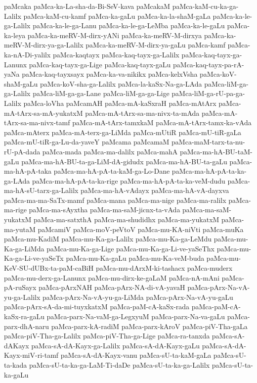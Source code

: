 {paMcaka
paMca-ka-La-sha-da-Bi-SeV-kava
paMcakaM
paMca-kaM-cu-ka-ga-Lalilx
paMca-kaM-cu-kamf
paMca-ka-gaLu
paMca-ka-la-shaM-gaLa
paMca-ka-le-ga-Lalilx
paMca-ka-le-ga-Lanu
paMca-ka-le-ga-LeMba
paMca-ka-le-gaLu
paMca-ka-leya
paMca-ka-meRV-M-dirx-yANi
paMca-ka-meRV-M-dirxya
paMca-ka-meRV-M-dirx-ya-ga-Lalilx
paMca-ka-meRV-M-dirx-ya-gaLu
paMca-kamf
paMca-ka-nA-Di-yalilx
paMca-kaqtayx
paMca-kaq-tayx-ga-Lalilx
paMca-kaq-tayx-ga-Lanunx
paMca-kaq-tayx-ga-Lige
paMca-kaq-tayx-gaLu
paMca-kaq-tayx-pa-rA-yaNa
paMca-kaq-tayxsayx
paMca-ka-va-nikikx
paMca-kelxVsha
paMca-koV-shaM-gaLu
paMca-koV-sha-ga-Lalilx
paMca-la-kaSx-Na-ga-LAda
paMca-liM-ga-ga-Lalilx
paMca-liM-ga-ga-Lane
paMca-liM-ga-ga-Lige
paMca-liM-ga-rU-pa-ga-Lalilx
paMca-loVha
paMcamAH
paMca-mA-kaSxraH
paMca-mAtArx
paMca-mA-tArx-sa-mA-yukatxM
paMca-mA-tArx-sa-ma-nivx-ta-mAda
paMca-mA-tArx-sa-ma-nivx-tamf
paMca-mA-tArx-tamxkaM
paMca-mA-tArx-tamx-ka-vAda
paMca-mAterx
paMca-mA-terx-ga-LiMda
paMca-mUtiR
paMca-mU-tiR-gaLa
paMca-mU-tiR-ga-Lu-da-yaveY
paMcama
paMcamaM
paMca-maM-tarx-ta-nu-rU-pA-dada
paMca-mada
paMca-ma-dalilx
paMca-mahA
paMca-ma-hA-BU-taM-gaLu
paMca-ma-hA-BU-ta-ga-LiM-dA-gidudx
paMca-ma-hA-BU-ta-gaLu
paMca-ma-hA-pA-taka
paMca-ma-hA-pA-ta-kaM-ga-Lo-Dane
paMca-ma-hA-pA-ta-ka-ga-LAda
paMca-ma-hA-pA-ta-ka-rige
paMca-ma-hA-pA-ta-ka-veM-dudu
paMca-ma-hA-sU-tarx-ga-Lalilx
paMca-ma-hA-vAdayx
paMca-ma-hA-vA-dayxva
paMca-ma-ma-SaTx-mamf
paMca-mana
paMca-ma-nige
paMca-ma-ralilx
paMca-ma-rige
paMca-ma-sAyxtha
paMca-ma-saM-jicnx-ta-vAda
paMca-ma-saM-yukatxM
paMca-ma-satxthA
paMca-ma-shudidhx
paMca-ma-yukatxM
paMca-ma-yutaM
paMcamiV
paMca-moV-peVtoV
paMca-mu-KA-niVti
paMca-muKa
paMca-mu-KadiM
paMca-mu-Ka-ga-Lalilx
paMca-mu-Ka-ga-LeMdu
paMca-mu-Ka-ga-LiMda
paMca-mu-Ka-ga-Lige
paMca-mu-Ka-ga-Li-ve-yaSeThx
paMca-mu-Ka-ga-Li-ve-yaSeTx
paMca-mu-Ka-gaLu
paMca-mu-Ka-veM-buda
paMca-mu-KeV-SU-dUBx-ta-paM-caBiH
paMca-mu-dArxM-ki-tashacx
paMca-muderx
paMca-mu-derx-ga-Lanunx
paMca-mu-dirx-ke-gaLaM
paMca-nA-mAni
paMca-pA-ruSayx
paMca-pArxNAH
paMca-pArx-NA-di-vA-yavaH
paMca-pArx-Na-vA-yu-ga-Lalilx
paMca-pArx-Na-vA-yu-ga-LiMda
paMca-pArx-Na-vA-yu-gaLu
paMca-pArx-sA-da-mi-tuyxkatxM
paMca-paM-cA-kaSx-rada
paMca-paM-cA-kaSx-ra-gaLu
paMca-parx-Na-vaM-ga-LegxyuM
paMca-parx-Na-va-gaLu
paMca-parx-dhA-naru
paMca-parx-kA-radiM
paMca-parx-kAroV
paMca-piV-Tha-gaLa
paMca-piV-Tha-ga-Lalilx
paMca-piV-Tha-ga-Lige
paMca-ra-tanxda
paMca-sA-dAKayx
paMca-sA-dA-Kayx-ga-Lalilx
paMca-sA-dA-Kayx-gaLu
paMca-sA-dA-Kayx-miV-ri-tamf
paMca-sA-dA-Kayx-vanu
paMca-sU-ta-kaM-gaLa
paMca-sU-ta-kada
paMca-sU-ta-ka-ga-LaM-Ti-daDe
paMca-sU-ta-ka-ga-Lalilx
paMca-sU-ta-ka-gaLu
}
